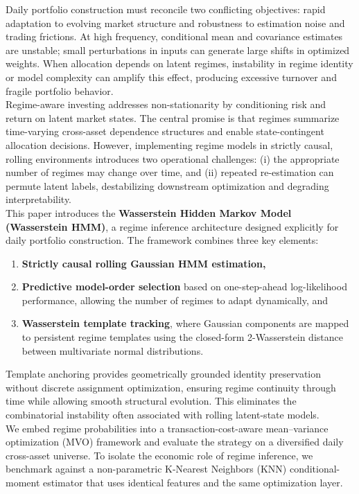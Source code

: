 \documentclass[11pt]{article}
\begin{document}
Daily portfolio construction must reconcile two conflicting objectives: 
rapid adaptation to evolving market structure and robustness to estimation noise and trading frictions. 
At high frequency, conditional mean and covariance estimates are unstable; small perturbations in inputs can generate large shifts in optimized weights. 
When allocation depends on latent regimes, instability in regime identity or model complexity can amplify this effect, producing excessive turnover and fragile portfolio behavior.\\
Regime-aware investing addresses non-stationarity by conditioning risk and return on latent market states. 
The central promise is that regimes summarize time-varying cross-asset dependence structures and enable state-contingent allocation decisions. 
However, implementing regime models in strictly causal, rolling environments introduces two operational challenges: 
(i) the appropriate number of regimes may change over time, and 
(ii) repeated re-estimation can permute latent labels, destabilizing downstream optimization and degrading interpretability.\\
This paper introduces the \textbf{Wasserstein Hidden Markov Model (Wasserstein HMM)}, 
a regime inference architecture designed explicitly for daily portfolio construction. 
The framework combines three key elements:
\begin{enumerate}
    \item \textbf{Strictly causal rolling Gaussian HMM estimation,}
    \item \textbf{Predictive model-order selection} based on one-step-ahead log-likelihood performance, allowing the number of regimes to adapt dynamically, and
    \item \textbf{Wasserstein template tracking}, where Gaussian components are mapped to persistent regime templates using the closed-form 2-Wasserstein distance between multivariate normal distributions.
\end{enumerate}
Template anchoring provides geometrically grounded identity preservation without discrete assignment optimization, 
ensuring regime continuity through time while allowing smooth structural evolution. 
This eliminates the combinatorial instability often associated with rolling latent-state models.\\
We embed regime probabilities into a transaction-cost-aware mean--variance optimization (MVO) framework and evaluate the strategy on a diversified daily cross-asset universe. 
To isolate the economic role of regime inference, we benchmark against a non-parametric K-Nearest Neighbors (KNN) conditional-moment estimator that uses identical features and the same optimization layer.\\
\end{document}

